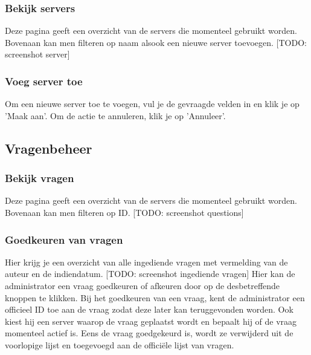 \documentclass[]{article}
\begin{document}
\subsubsection{Bekijk servers}
Deze pagina geeft een overzicht van de servers die momenteel gebruikt worden. Bovenaan kan men filteren op naam alsook een nieuwe server toevoegen. [TODO: screenshot server]

\subsubsection{Voeg server toe}
Om een nieuwe server toe te voegen, vul je de gevraagde velden in en klik je op 'Maak aan'. Om de actie te annuleren, klik je op 'Annuleer'.

\subsection{Vragenbeheer}

\subsubsection{Bekijk vragen}
Deze pagina geeft een overzicht van de servers die momenteel gebruikt worden. Bovenaan kan men filteren op ID. [TODO: screenshot questions]

\subsubsection{Goedkeuren van vragen}
Hier krijg je een overzicht van alle ingediende vragen met vermelding van de auteur en de indiendatum. [TODO: screenshot ingediende vragen] Hier kan de administrator een vraag goedkeuren of afkeuren door op de desbetreffende knoppen te klikken. Bij het goedkeuren van een vraag, kent de administrator een officieel ID toe aan de vraag zodat deze later kan teruggevonden worden. Ook kiest hij een server waarop de vraag geplaatst wordt en bepaalt hij of de vraag momenteel actief is. Eens de vraag goedgekeurd is, wordt ze verwijderd uit de voorlopige lijst en toegevoegd aan de officiële lijst van vragen.
\end{document}
